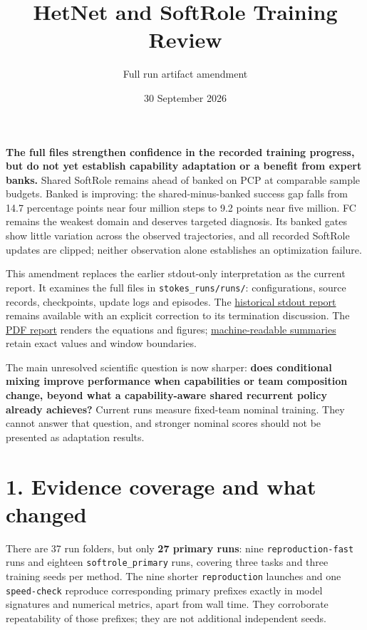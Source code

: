 \documentclass[
  10pt,
]{article}
\title{HetNet and SoftRole Training Review}
\subtitle{Full run artifact amendment}
\author{}
\date{30 September 2026}
\begin{document}
\maketitle

{
\hypersetup{linkcolor=}
\setcounter{tocdepth}{2}
\tableofcontents
}
\textbf{The full files strengthen confidence in the recorded training
progress, but do not yet establish capability adaptation or a benefit
from expert banks.} Shared SoftRole remains ahead of banked on PCP at
comparable sample budgets. Banked is improving: the shared-minus-banked
success gap falls from 14.7 percentage points near four million steps to
9.2 points near five million. FC remains the weakest domain and deserves
targeted diagnosis. Its banked gates show little variation across the
observed trajectories, and all recorded SoftRole updates are clipped;
neither observation alone establishes an optimization failure.

This amendment replaces the earlier stdout-only interpretation as the
current report. It examines the full files in
\texttt{stokes\_runs/runs/}: configurations, source records,
checkpoints, update logs and episodes. The
\href{stdout_snapshot.md}{historical stdout report} remains available
with an explicit correction to its termination discussion. The
\href{training_report.pdf}{PDF report} renders the equations and
figures; \href{full_runs/summary.json}{machine-readable summaries}
retain exact values and window boundaries.

The main unresolved scientific question is now sharper: \textbf{does
conditional mixing improve performance when capabilities or team
composition change, beyond what a capability-aware shared recurrent
policy already achieves?} Current runs measure fixed-team nominal
training. They cannot answer that question, and stronger nominal scores
should not be presented as adaptation results.

\section{1. Evidence coverage and what
changed}\label{evidence-coverage-and-what-changed}

There are 37 run folders, but only \textbf{27 primary runs}: nine
\texttt{reproduction-fast} runs and eighteen \texttt{softrole\_primary}
runs, covering three tasks and three training seeds per method. The nine
shorter \texttt{reproduction} launches and one \texttt{speed-check}
reproduce corresponding primary prefixes exactly in model signatures and
numerical metrics, apart from wall time. They corroborate repeatability
of those prefixes; they are not additional independent seeds.
\end{document}
